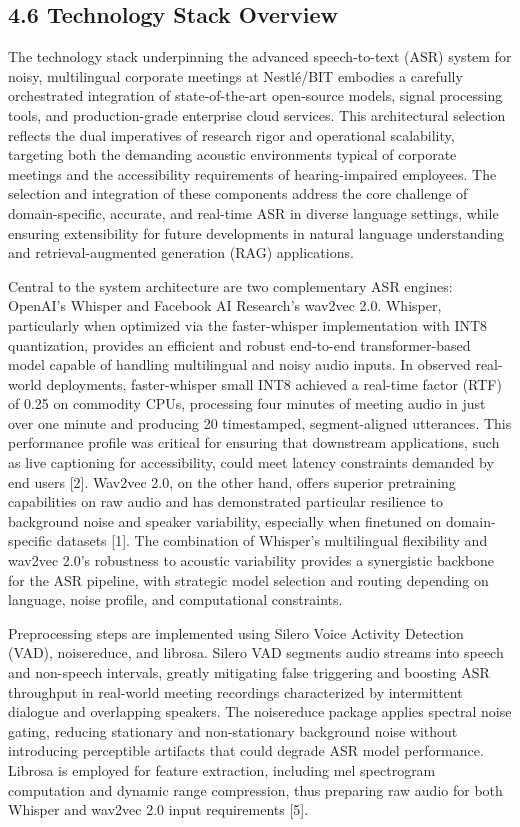 \documentclass[12pt,a4paper]{article}
\begin{document}
\subsection{4.6 Technology Stack Overview}


The technology stack underpinning the advanced speech-to-text (ASR) system for noisy, multilingual corporate meetings at Nestlé/BIT embodies a carefully orchestrated integration of state-of-the-art open-source models, signal processing tools, and production-grade enterprise cloud services. This architectural selection reflects the dual imperatives of research rigor and operational scalability, targeting both the demanding acoustic environments typical of corporate meetings and the accessibility requirements of hearing-impaired employees. The selection and integration of these components address the core challenge of domain-specific, accurate, and real-time ASR in diverse language settings, while ensuring extensibility for future developments in natural language understanding and retrieval-augmented generation (RAG) applications.


Central to the system architecture are two complementary ASR engines: OpenAI’s Whisper and Facebook AI Research's wav2vec 2.0. Whisper, particularly when optimized via the faster-whisper implementation with INT8 quantization, provides an efficient and robust end-to-end transformer-based model capable of handling multilingual and noisy audio inputs. In observed real-world deployments, faster-whisper small INT8 achieved a real-time factor (RTF) of 0.25 on commodity CPUs, processing four minutes of meeting audio in just over one minute and producing 20 timestamped, segment-aligned utterances. This performance profile was critical for ensuring that downstream applications, such as live captioning for accessibility, could meet latency constraints demanded by end users [2]. Wav2vec 2.0, on the other hand, offers superior pretraining capabilities on raw audio and has demonstrated particular resilience to background noise and speaker variability, especially when finetuned on domain-specific datasets [1]. The combination of Whisper’s multilingual flexibility and wav2vec 2.0’s robustness to acoustic variability provides a synergistic backbone for the ASR pipeline, with strategic model selection and routing depending on language, noise profile, and computational constraints.


Preprocessing steps are implemented using Silero Voice Activity Detection (VAD), noisereduce, and librosa. Silero VAD segments audio streams into speech and non-speech intervals, greatly mitigating false triggering and boosting ASR throughput in real-world meeting recordings characterized by intermittent dialogue and overlapping speakers. The noisereduce package applies spectral noise gating, reducing stationary and non-stationary background noise without introducing perceptible artifacts that could degrade ASR model performance. Librosa is employed for feature extraction, including mel spectrogram computation and dynamic range compression, thus preparing raw audio for both Whisper and wav2vec 2.0 input requirements [5].
\end{document}
